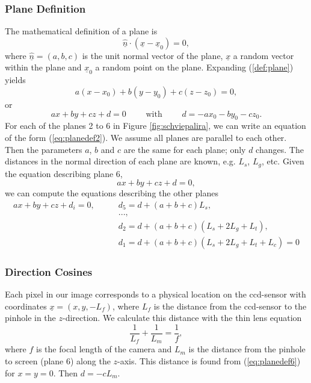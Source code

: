 \documentclass{article}
\begin{document}
\subsubsection{Plane Definition}
The mathematical definition of a plane is
\begin{equation}
	\label{def:plane}
	\underline{\hat{n}} \cdot (\underline{x}-\underline{x}_0) = 0,
\end{equation}
where $\underline{\hat{n}} = (a,b,c)$ is the unit normal vector of the plane, $\underline{x}$ a random vector within the plane and $\underline{x}_0$ a random point on the plane. Expanding (\ref{def:plane}) yields
\begin{equation}
	a(x-x_0) + b(y-y_0) + c(z-z_0) = 0, 
\end{equation}
or 
\begin{equation}
	\label{eq:planedef2}
	ax+by+cz + d = 0 \qquad \mbox{ with } \qquad d = - a x_0 - b y_0 - c z_0.
\end{equation}
For each of the planes 2 to 6 in Figure \ref{fig:schviepalira}, we can write an equation of the form (\ref{eq:planedef2}). We assume all planes are parallel to each other. Then the parameters $a$, $b$ and $c$ are the same for each plane; only $d$ changes. The distances in the normal direction of each plane are known, e.g. $L_s$, $L_g$, etc. Given the equation describing plane 6, 
\begin{equation}
\label{eq:planedef6}
	a x + b y + c z + d = 0,
\end{equation}
we can compute the equations describing the other planes
\begin{align}
a x + b y + c z + d_i = 0, \qquad  
& d_5 = d + (a+b+c) L_s, \\
& ..., \nonumber \\ 
& d_2 = d + (a+b+c) (L_s+2L_g+L_t), \\
\label{eq:planedef1}
& d_1 = d + (a+b+c) (L_s+2L_g+L_t+L_c) = 0 
\end{align}

\subsubsection{Direction Cosines}
Each pixel in our image corresponds to a physical location on the ccd-sensor with coordinates $\underline{x} = (x,y, -L_f)$, where $L_f$ is the distance from the ccd-sensor to the pinhole in the $z$-direction. We calculate this distance with the thin lens equation
\begin{equation}
 \frac{1}{L_f} + \frac{1}{L_m} = \frac{1}{f},
\end{equation}
where $f$ is the focal length of the camera and $L_m$ is the distance from the pinhole to screen (plane 6) along the $z$-axis. This distance is found from (\ref{eq:planedef6}) for $x=y=0$. Then $d = - c L_m$.
\end{document}
